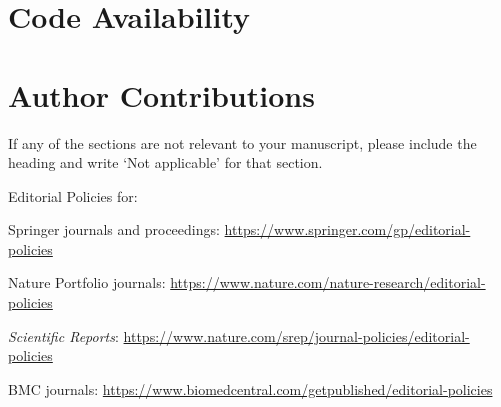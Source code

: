 \documentclass[pdflatex,sn-nature]{sn-jnl}%
\begin{document}
\section*{Code Availability}


\section*{Author Contributions}


\noindent
If any of the sections are not relevant to your manuscript, please include the heading and write `Not applicable' for that section. 


\bigskip
\begin{flushleft}%
Editorial Policies for:

\bigskip\noindent
Springer journals and proceedings: \url{https://www.springer.com/gp/editorial-policies}

\bigskip\noindent
Nature Portfolio journals: \url{https://www.nature.com/nature-research/editorial-policies}

\bigskip\noindent
\textit{Scientific Reports}: \url{https://www.nature.com/srep/journal-policies/editorial-policies}

\bigskip\noindent
BMC journals: \url{https://www.biomedcentral.com/getpublished/editorial-policies}
\end{flushleft}
\end{document}
